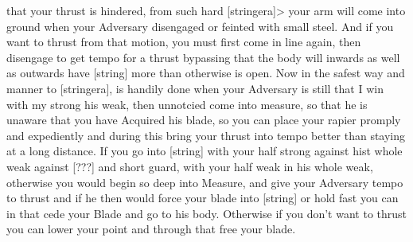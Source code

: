 \newpage


\newpage



that your thrust is hindered, from such hard [stringera]> your arm will
come into ground when your Adversary disengaged or feinted with
small steel. And if you want to thrust from that motion, you must
first come in line again, then disengage to get tempo for a thrust
bypassing that the body will inwards as well as outwards have [string]
more than otherwise is open. Now in the safest way and manner to
[stringera], is handily done when your Adversary is still that I win
with my strong his weak, then unnotcied come into measure, so that he
is unaware that you have Acquired his blade, so you can place your
rapier promply and expediently and during this bring your thrust into
tempo better than staying at a long distance. If you go into [string]
with your half strong against hist whole weak against [???] and short
guard, with your half weak in his whole weak, otherwise you would
begin so deep into Measure, and give your Adversary tempo to thrust
and if he then would force your blade into [string] or hold fast you
can in that cede your Blade and go to his body. Otherwise if you don't
want to thrust you can lower your point and through that free your
blade.

